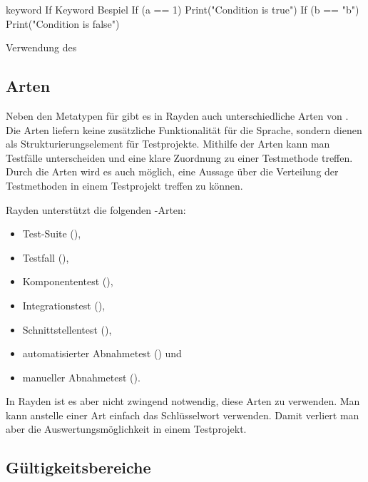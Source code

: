 \begin{program}
\begin{JavaCode}
keyword If Keyword Bespiel {
	If (a == 1) {
		Print("Condition is true")
	}
	If (b == "b") {
		Print("Condition is false")
	}
}
\end{JavaCode}
\caption{Verwendung des }
\label{prog:ifKeywordUsage}
\end{program}

\subsection{Arten}
\label{cha:KeywordTypes}

Neben den Metatypen für  gibt es in Rayden auch unterschiedliche Arten von . Die Arten liefern keine zusätzliche Funktionalität für die Sprache, sondern dienen als Strukturierungselement für Testprojekte. Mithilfe der Arten kann man Testfälle unterscheiden und eine klare Zuordnung zu einer Testmethode treffen. Durch die Arten wird es auch möglich, eine Aussage über die Verteilung der Testmethoden in einem Testprojekt treffen zu können. 

\SuperPar
Rayden unterstützt die folgenden -Arten:

\begin{itemize}
\item Test-Suite (),
\item Testfall (),
\item Komponententest (),
\item Integrationstest (),
\item Schnittstellentest (),
\item automatisierter Abnahmetest () und
\item manueller Abnahmetest ().
\end{itemize}

\SuperPar
In Rayden ist es aber nicht zwingend notwendig, diese Arten zu verwenden. Man kann anstelle einer Art einfach das Schlüsselwort  verwenden. Damit verliert man aber die Auswertungsmöglichkeit in einem Testprojekt. 

\subsection{Gültigkeitsbereiche}
\label{cha:KeywordScope}

